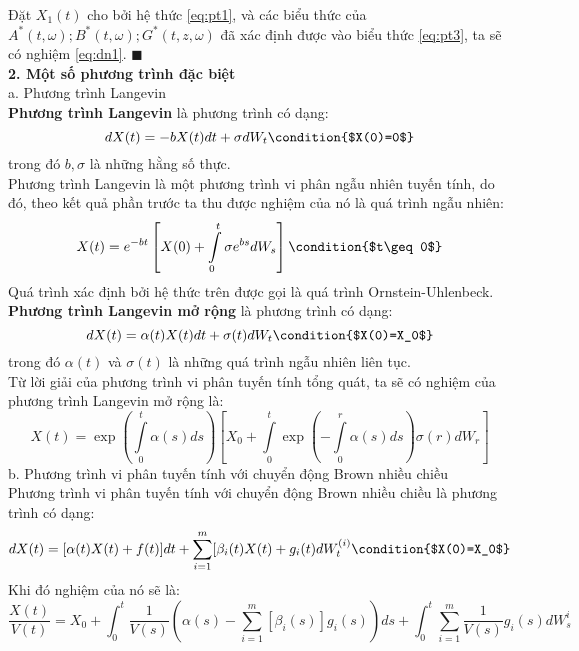 \documentclass[12pt,a4paper]{article}
\begin{document}
Đặt $X_1(t)$ cho bởi hệ thức \eqref{eq:pt1}, và các biểu thức của $A^*(t,\omega);B^*(t,\omega);G^*(t,z,\omega)$ đã xác định được vào biểu thức \eqref{eq:pt3}, ta sẽ có nghiệm \eqref{eq:dn1}. $\blacksquare$\\
\textbf{2. Một số phương trình đặc biệt}\\
a. Phương trình Langevin\\
\textbf{Phương trình Langevin} là phương trình có dạng:
\begin{equation*}
	dX(t)=-bX(t)dt+\sigma dW_t \condition{$X(0)=0$}
\end{equation*}
trong đó $b, \sigma$ là những hằng số thực.\\
Phương trình Langevin là một phương trình vi phân ngẫu nhiên tuyến tính, do đó, theo kết quả phần trước ta thu được nghiệm của nó là quá trình ngẫu nhiên:
\begin{equation*}
	X(t)=e^{-bt}\left[X(0)+\int\limits_{0}^{t}\sigma e^{bs}dW_s \right] \condition{$t\geq 0$}
\end{equation*}
Quá trình xác định bởi hệ thức trên được gọi là quá trình Ornstein-Uhlenbeck.\\
\textbf{Phương trình Langevin mở rộng} là phương trình có dạng:
\begin{equation*}
	dX(t)=\alpha(t)X(t)dt+\sigma (t)dW_t \condition{$X(0)=X_0$}
\end{equation*}
trong đó $\alpha(t)$ và $\sigma(t)$ là những quá trình ngẫu nhiên liên tục.\\
Từ lời giải của phương trình vi phân tuyến tính tổng quát, ta sẽ có nghiệm của phương trình Langevin mở rộng là:
\begin{equation*}
	X(t)=\exp\left(\int\limits_{0}^{t}\alpha(s)ds \right)\left[X_0+\int\limits_{0}^{t}\exp\left(-\int\limits_{0}^{r}\alpha(s)ds \right)\sigma(r)dW_r \right]
\end{equation*}
b. Phương trình vi phân tuyến tính với chuyển động Brown nhiều chiều\\
Phương trình vi phân tuyến tính với chuyển động Brown nhiều chiều là phương trình có dạng:
\begin{equation*}
	dX(t)=[\alpha(t)X(t)+f(t)]dt+\sum_{i=1}^{m}[\beta_i(t)X(t)+g_i(t)dW_t^{(i)} \condition{$X(0)=X_0$}
\end{equation*}
Khi đó nghiệm của nó sẽ là:
\begin{equation*}
	\dfrac{X(t)}{V(t)}=X_0+\int_{0}^{t}\dfrac{1}{V(s)}\left(\alpha(s)-\sum_{i=1}^{m}[\beta_i(s)]g_i(s) \right)ds+\int_{0}^{t}\sum_{i=1}^{m}\dfrac{1}{V(s)}g_i(s)dW_{s}^{i}
\end{equation*}
\end{document}
